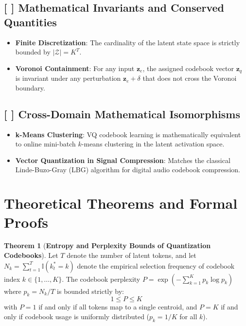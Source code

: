 \documentclass[11pt,a4paper]{article}
\theoremstyle{definition}
\newtheorem{theorem}{\textbf{Theorem}}[section]
\begin{document}
\subsection{[ ] Mathematical Invariants and Conserved Quantities}
\begin{itemize}
    \item \textbf{Finite Discretization}: The cardinality of the latent state space is strictly bounded by $|\mathcal{Z}| = K^T$.
    \item \textbf{Voronoi Containment}: For any input $\mathbf{z}_e$, the assigned codebook vector $\mathbf{z}_q$ is invariant under any perturbation $\mathbf{z}_e + \delta$ that does not cross the Voronoi boundary.
\end{itemize}

\subsection{[ ] Cross-Domain Mathematical Isomorphisms}
\begin{itemize}
    \item \textbf{k-Means Clustering}: VQ codebook learning is mathematically equivalent to online mini-batch $k$-means clustering in the latent activation space.
    \item \textbf{Vector Quantization in Signal Compression}: Matches the classical Linde-Buzo-Gray (LBG) algorithm for digital audio codebook compression.
\end{itemize}

\section{Theoretical Theorems and Formal Proofs}

\begin{theorem}[\textbf{Entropy and Perplexity Bounds of Quantization Codebooks}]
Let $T$ denote the number of latent tokens, and let $N_k = \sum_{t=1}^T \mathbb{I}(k^*_t = k)$ denote the empirical selection frequency of codebook index $k \in \{1, \dots, K\}$. The codebook perplexity $P = \exp(-\sum_{k=1}^K p_k \log p_k)$ where $p_k = N_k / T$ is bounded strictly by:
{\boldmath
\begin{equation}
1 \le P \le K
\end{equation}
}
with $P = 1$ if and only if all tokens map to a single centroid, and $P = K$ if and only if codebook usage is uniformly distributed ($p_k = 1/K$ for all $k$).
\end{theorem}
\end{document}
